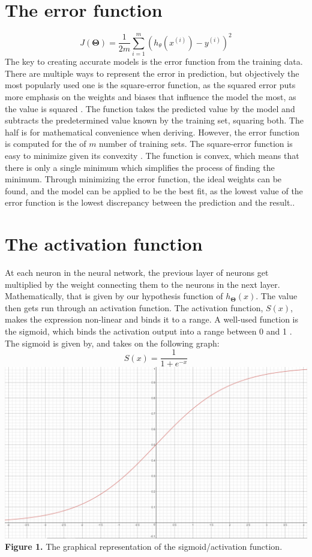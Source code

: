 \documentclass[a4paper,12pt]{article}
\begin{document}
\section{The error function}
\[J(\boldsymbol{\Theta}) = \frac{1}{2m} \sum_{i=1}^m (h_\theta(x^{(i)}) - y^{(i)})^2\]
The key to creating accurate models is the error function from the training data. There are multiple ways to represent the error in prediction, but objectively the most popularly used one is the square-error function, as the squared error puts more emphasis on the weights and biases that influence the model the most, as the value is squared \cite{patternml}. The function takes the predicted value by the model and subtracts the predetermined value known by the training set, squaring both. The half is for mathematical convenience when deriving. However, the error function is computed for the of $m$ number of training sets. 
The square-error function is easy to minimize given its convexity \cite{convex}. The function is convex, which means that there is only a single minimum which simplifies the process of finding the minimum. Through minimizing the error function, the ideal weights can be found, and the model can be applied to be the best fit, as the lowest value of the error function is the lowest discrepancy between the prediction and the result..

\section{The activation function}
At each neuron in the neural network, the previous layer of neurons get multiplied by the weight connecting them to the neurons in the next layer. Mathematically, that is given by our hypothesis function of $h_{\boldsymbol{\Theta}}(x)$. The value then gets run through an activation function. The activation function, $S(x)$, makes the expression non-linear and binds it to a range. A well-used function is the sigmoid, which binds the activation output into a range between 0 and 1 \cite{patternml}. The sigmoid is given by, and takes on the following graph:
\[S(x) = \frac{1}{1+e^{-x}}\]
\includegraphics[scale=0.25]{sigmoid}
\textbf{Figure 1.} The graphical representation of the sigmoid/activation function.\\
\end{document}
